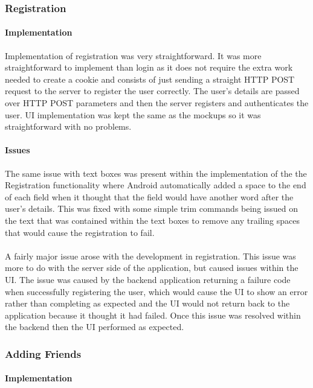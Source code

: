 \subsubsection*{Registration}

\paragraph*{Implementation}

Implementation of registration was very straightforward. It was more straightforward to implement than login as it does not require the extra work needed to create a cookie and consists of just sending a straight HTTP POST request to the server to register the user correctly. The user's details are passed over HTTP POST parameters and then the server registers and authenticates the user. UI implementation was kept the same as the mockups so it was straightforward with no problems.

\paragraph*{Issues}

The same issue with text boxes was present within the implementation of the the Registration functionality where Android automatically added a space to the end of each field when it thought that the field would have another word after the user's details. This was fixed with some simple trim commands being issued on the text that was contained within the text boxes to remove any trailing spaces that would cause the registration to fail.\\
\\
A fairly major issue arose with the development in registration. This issue was more to do with the server side of the application, but caused issues within the UI. The issue was caused by the backend application returning a failure code when successfully registering the user, which would cause the UI to show an error rather than completing as expected and the UI would not return back to the application because it thought it had failed. Once this issue was resolved within the backend then the UI performed as expected.


\subsubsection*{Adding Friends}

\paragraph*{Implementation}

